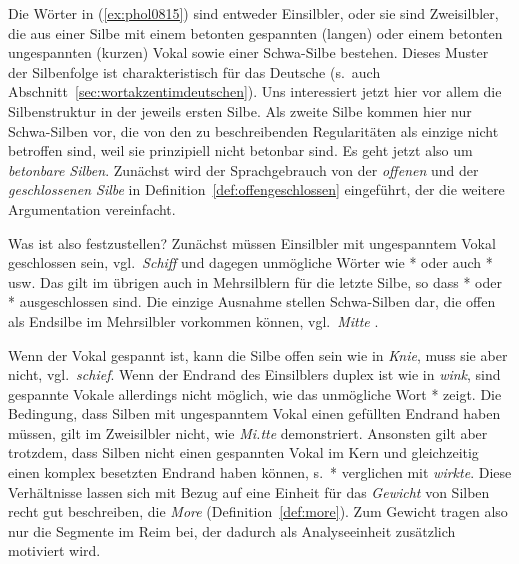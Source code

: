 Die Wörter in (\ref{ex:phol0815}) sind entweder Einsilbler, oder sie sind Zweisilbler, die aus einer Silbe mit einem betonten gespannten (langen) oder einem betonten ungespannten (kurzen) Vokal sowie einer Schwa-Silbe bestehen.
Dieses Muster der Silbenfolge ist charakteristisch für das Deutsche (s.\ auch Abschnitt~\ref{sec:wortakzentimdeutschen}).
Uns interessiert jetzt hier vor allem die Silbenstruktur in der jeweils ersten Silbe.
Als zweite Silbe kommen hier nur Schwa-Silben vor, die von den zu beschreibenden Regularitäten als einzige nicht betroffen sind, weil sie prinzipiell nicht betonbar sind.
Es geht jetzt also um \textit{betonbare Silben}.
Zunächst wird der Sprachgebrauch von der \textit{offenen} und der \textit{geschlossenen Silbe} in Definition~\ref{def:offengeschlossen} eingeführt, der die weitere Argumentation vereinfacht.


Was ist also festzustellen?
Zunächst müssen Einsilbler mit ungespanntem Vokal geschlossen sein, vgl.\ \textit{Schiff} und dagegen unmögliche Wörter wie *\textipa{[knI]} oder auch *\textipa{[tO]} usw.
Das gilt im übrigen auch in Mehrsilblern für die letzte Silbe, so dass *\textipa{[kUn.dI]} oder *\textipa{[tu:.pO]} ausgeschlossen sind.
Die einzige Ausnahme stellen Schwa-Silben dar, die offen als Endsilbe im Mehrsilbler vorkommen können, vgl.\ \textit{Mitte} \textipa{[mi.t@]}.

Wenn der Vokal gespannt ist, kann die Silbe offen sein wie in \textit{Knie}, muss sie aber nicht, vgl.\ \textit{schief}.
Wenn der Endrand des Einsilblers duplex ist wie in \textit{wink}, sind gespannte Vokale allerdings nicht möglich, wie das unmögliche Wort *\textipa{[vi:Nk]} zeigt.
Die Bedingung, dass Silben mit ungespanntem Vokal einen gefüllten Endrand haben müssen, gilt im Zweisilbler nicht, wie \textit{Mi.tte} demonstriert.
Ansonsten gilt aber trotzdem, dass Silben nicht einen gespannten Vokal im Kern und gleichzeitig einen komplex besetzten Endrand haben können, s.\ *\textipa{[v\t{i5}k.t@]} verglichen mit \textit{wirkte}.
Diese Verhältnisse lassen sich mit Bezug auf eine Einheit für das \textit{Gewicht} von Silben recht gut beschreiben, die \textit{More} (Definition~\ref{def:more}).
Zum Gewicht tragen also nur die Segmente im Reim bei, der dadurch als Analyseeinheit zusätzlich motiviert wird.

